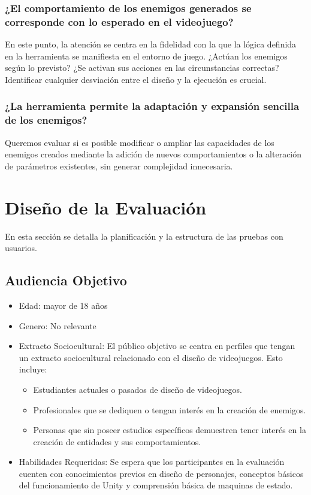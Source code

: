 \subsubsection{¿El comportamiento de los enemigos generados se corresponde con lo esperado en el videojuego?}
En este punto, la atención se centra en la fidelidad con la que la lógica definida en la herramienta se manifiesta en el entorno de juego. ¿Actúan los enemigos según lo previsto? ¿Se activan sus acciones en las circunstancias correctas? Identificar cualquier desviación entre el diseño y la ejecución es crucial.\\

\subsubsection{¿La herramienta permite la adaptación y expansión sencilla de los enemigos?}
Queremos evaluar si es posible modificar o ampliar las capacidades de los enemigos creados mediante la adición de nuevos comportamientos o la alteración de parámetros existentes, sin generar complejidad innecesaria.

\section{Diseño de la Evaluación}
En esta sección se detalla la planificación y la estructura de las pruebas con usuarios.

\subsection{Audiencia Objetivo}
\begin{itemize}
\item Edad: mayor de 18 años
\item Genero: No relevante
\item Extracto Sociocultural: El público objetivo se centra en perfiles que tengan un extracto sociocultural relacionado con el diseño de videojuegos. Esto incluye:
\begin{itemize}
\item Estudiantes actuales o pasados de diseño de videojuegos.
\item Profesionales que se dediquen o tengan interés en la creación de enemigos.
\item Personas que sin poseer estudios específicos demuestren tener interés en la creación de entidades y sus comportamientos. 
\end{itemize}

\item Habilidades Requeridas:  Se espera que los participantes en la evaluación cuenten con conocimientos previos en diseño de personajes, conceptos básicos del funcionamiento de Unity y comprensión básica de maquinas de estado.
\end{itemize}


